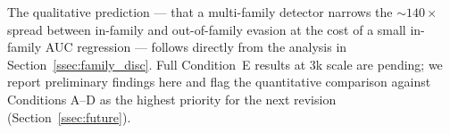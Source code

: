 The qualitative prediction — that a multi-family detector narrows the
\(\sim\!140\times\) spread between in-family and out-of-family evasion
at the cost of a small in-family AUC regression — follows directly from
the analysis in Section~\ref{ssec:family_disc}. Full Condition~E results
at \(3\)k scale are pending; we report preliminary findings here and
flag the quantitative comparison against Conditions A–D as the highest
priority for the next revision (Section~\ref{ssec:future}).
